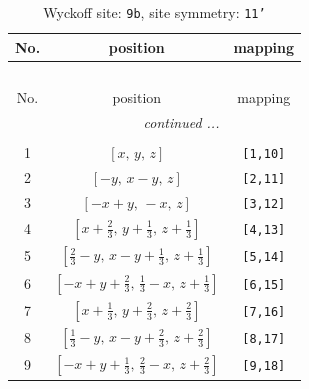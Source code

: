\documentclass[fleqn,8pt]{jsarticle}
\begin{document}
\begin{longtable}{ccc}
\caption{Wyckoff site: {\tt 9b}, site symmetry: {\tt 11'}}
 \\
 \hline \hline
No. & position & mapping \\ \hline \endfirsthead

\multicolumn{2}{l}{\tablename\ \thetable{}} \\
 \hline \hline
No. & position & mapping \\ \hline \endhead

 \hline \hline
\multicolumn{2}{r}{\footnotesize\it continued ...} \\ \endfoot

 \hline \hline
\multicolumn{2}{r}{} \\ \endlastfoot

1 & $\left[ x,\, y,\, z \right]$ & {\tt [1,10]} \\ \hline
2 & $\left[ - y,\, x - y,\, z \right]$ & {\tt [2,11]} \\ \hline
3 & $\left[ - x + y,\, - x,\, z \right]$ & {\tt [3,12]} \\ \hline
4 & $\left[ x + \frac{2}{3},\, y + \frac{1}{3},\, z + \frac{1}{3} \right]$ & {\tt [4,13]} \\ \hline
5 & $\left[ \frac{2}{3} - y,\, x - y + \frac{1}{3},\, z + \frac{1}{3} \right]$ & {\tt [5,14]} \\ \hline
6 & $\left[ - x + y + \frac{2}{3},\, \frac{1}{3} - x,\, z + \frac{1}{3} \right]$ & {\tt [6,15]} \\ \hline
7 & $\left[ x + \frac{1}{3},\, y + \frac{2}{3},\, z + \frac{2}{3} \right]$ & {\tt [7,16]} \\ \hline
8 & $\left[ \frac{1}{3} - y,\, x - y + \frac{2}{3},\, z + \frac{2}{3} \right]$ & {\tt [8,17]} \\ \hline
9 & $\left[ - x + y + \frac{1}{3},\, \frac{2}{3} - x,\, z + \frac{2}{3} \right]$ & {\tt [9,18]} \\
\end{longtable}
\end{document}
